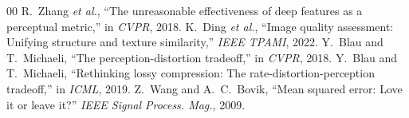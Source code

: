 \documentclass[11pt]{article}
\begin{document}
\begin{thebibliography}{00}
 R.~Zhang \textit{et al.}, ``The unreasonable effectiveness of deep features as a perceptual metric,'' in \textit{CVPR}, 2018.
 K.~Ding \textit{et al.}, ``Image quality assessment: Unifying structure and texture similarity,'' \textit{IEEE TPAMI}, 2022.
 Y.~Blau and T.~Michaeli, ``The perception-distortion tradeoff,'' in \textit{CVPR}, 2018.
 Y.~Blau and T.~Michaeli, ``Rethinking lossy compression: The rate-distortion-perception tradeoff,'' in \textit{ICML}, 2019.
 Z.~Wang and A.~C.~Bovik, ``Mean squared error: Love it or leave it?'' \textit{IEEE Signal Process. Mag.}, 2009.
\end{thebibliography}
\end{document}
